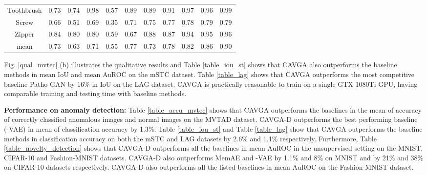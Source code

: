 \documentclass[runningheads]{llncs}
\begin{document}
\begin{table}[h]
\begin{center}
\begin{tabular}{ccccccccccc}
		Toothbrush  &\cellcolor{blue!10}0.73 &\cellcolor{blue!15}0.74  &\cellcolor{blue!70}0.98 &\cellcolor{blue!5}0.57 &\cellcolor{blue!30}0.89 &\cellcolor{blue!30}0.89  &\cellcolor{blue!40}0.91 &\cellcolor{blue!60}0.97  &\cellcolor{blue!50}0.96 &\cellcolor{blue!80}\color{white}0.99\\
		          
		Screw &\cellcolor{blue!25}0.66    &\cellcolor{blue!15}0.51  &\cellcolor{blue!30}0.69 &\cellcolor{blue!10}0.35 &\cellcolor{blue!40}0.71 &\cellcolor{blue!50}0.75 &\cellcolor{blue!60}0.77 &\cellcolor{blue!70}0.78  &\cellcolor{blue!80}\color{white}0.79 &\cellcolor{blue!80}\color{white}0.79\\
		          
		Zipper  &\cellcolor{blue!30}0.84  &\cellcolor{blue!20}0.80  &\cellcolor{blue!20}0.80 &\cellcolor{blue!10}0.59 &\cellcolor{blue!15}0.67 &\cellcolor{blue!50}0.88   &\cellcolor{blue!40}0.87  &\cellcolor{blue!60}0.94  &\cellcolor{blue!70}0.95 &\cellcolor{blue!80}\color{white}0.96\\
\midrule
mean &\cellcolor{blue!30}0.73 &\cellcolor{blue!15}0.63 &\cellcolor{blue!20}0.71 &\cellcolor{blue!5}0.55 &\cellcolor{blue!40}0.77 &\cellcolor{blue!30}0.73  &\cellcolor{blue!50}0.78 &\cellcolor{blue!60}0.82 &\cellcolor{blue!70}0.86 &\cellcolor{blue!80}\color{white}0.90\\
\bottomrule
\end{tabular}

\end{center}


\end{table}
Fig. \ref{qual_mvtec} (b) illustrates the qualitative results and Table \ref{table_iou_st} shows that CAVGA also outperforms the baseline methods in mean IoU and mean AuROC on the mSTC dataset. Table \ref{table_lag} shows that CAVGA outperforms the most competitive baseline Patho-GAN \cite{wang2019pathology} by 16\% in IoU on the LAG dataset. CAVGA is practically reasonable to train on a single GTX 1080Ti GPU, having comparable training and testing time with baseline methods. 

\textbf{Performance on anomaly detection:} Table \ref{table_accu_mvtec} shows that CAVGA outperforms the baselines in the mean of accuracy of correctly classified anomalous images and normal images on the MVTAD dataset. CAVGA-D outperforms the best performing baseline (-VAE) in mean of classification accuracy by 1.3\%. Table \ref{table_iou_st} and Table \ref{table_lag} show that CAVGA outperforms the baseline methods in classification accuracy on both the mSTC and LAG datasets by 2.6\% and 1.1\% respectively. Furthermore,  Table \ref{table_novelty_detection} shows that CAVGA-D outperforms all the baselines in mean AuROC in the unsupervised setting on the MNIST, CIFAR-10 and Fashion-MNIST datasets. CAVGA-D also outperforms MemAE \cite{gong2019memorizing} and -VAE \cite{higgins2017beta} by 1.1\% and 8\% on MNIST and by 21\% and 38\% on CIFAR-10 datasets respectively. CAVGA-D also outperforms all the listed baselines in mean AuROC on the Fashion-MNIST dataset. 
\end{document}
